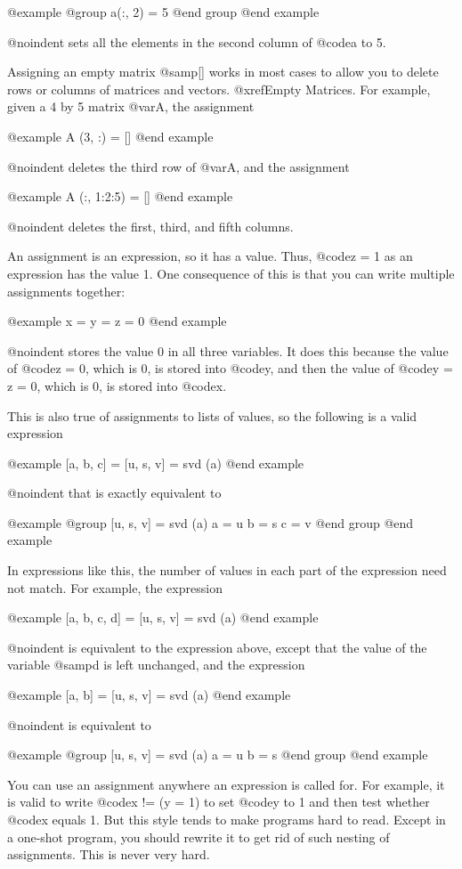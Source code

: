 @example
@group
a(:, 2) = 5
@end group
@end example

@noindent
sets all the elements in the second column of @code{a} to 5.

Assigning an empty matrix @samp{[]} works in most cases to allow you to
delete rows or columns of matrices and vectors.  @xref{Empty Matrices}.
For example, given a 4 by 5 matrix @var{A}, the assignment

@example
A (3, :) = []
@end example

@noindent
deletes the third row of @var{A}, and the assignment

@example
A (:, 1:2:5) = []
@end example

@noindent
deletes the first, third, and fifth columns.

An assignment is an expression, so it has a value.  Thus, @code{z = 1}
as an expression has the value 1.  One consequence of this is that you
can write multiple assignments together:

@example
x = y = z = 0
@end example

@noindent
stores the value 0 in all three variables.  It does this because the
value of @code{z = 0}, which is 0, is stored into @code{y}, and then
the value of @code{y = z = 0}, which is 0, is stored into @code{x}.

This is also true of assignments to lists of values, so the following is
a valid expression

@example
[a, b, c] = [u, s, v] = svd (a)
@end example

@noindent
that is exactly equivalent to

@example
@group
[u, s, v] = svd (a)
a = u
b = s
c = v
@end group
@end example

In expressions like this, the number of values in each part of the
expression need not match.  For example, the expression

@example
[a, b, c, d] = [u, s, v] = svd (a)
@end example

@noindent
is equivalent to the expression above, except that the value of the
variable @samp{d} is left unchanged, and the expression

@example
[a, b] = [u, s, v] = svd (a)
@end example

@noindent
is equivalent to 

@example
@group
[u, s, v] = svd (a)
a = u
b = s
@end group
@end example

You can use an assignment anywhere an expression is called for.  For
example, it is valid to write @code{x != (y = 1)} to set @code{y} to 1
and then test whether @code{x} equals 1.  But this style tends to make
programs hard to read.  Except in a one-shot program, you should rewrite
it to get rid of such nesting of assignments.  This is never very hard.

